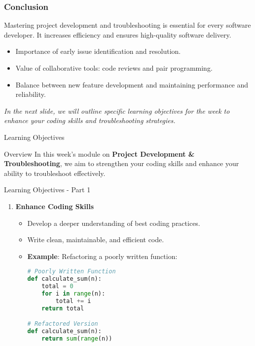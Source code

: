 \documentclass[aspectratio=169]{beamer}
\begin{document}
\begin{frame}[fragile]
    \frametitle{Conclusion}
    Mastering project development and troubleshooting is essential for every software developer. 
    It increases efficiency and ensures high-quality software delivery.
    \begin{itemize}
        \item Importance of early issue identification and resolution.
        \item Value of collaborative tools: code reviews and pair programming.
        \item Balance between new feature development and maintaining performance and reliability.
    \end{itemize}
    
    \textit{In the next slide, we will outline specific learning objectives for the week to enhance your coding skills and troubleshooting strategies.}
\end{frame}

\begin{frame}{Learning Objectives}
    \begin{block}{Overview}
        In this week's module on \textbf{Project Development \& Troubleshooting}, we aim to strengthen your coding skills and enhance your ability to troubleshoot effectively.
    \end{block}
\end{frame}

\begin{frame}{Learning Objectives - Part 1}
    \begin{enumerate}
        \item \textbf{Enhance Coding Skills}
            \begin{itemize}
                \item Develop a deeper understanding of best coding practices.
                \item Write clean, maintainable, and efficient code.
                \item \textbf{Example}: Refactoring a poorly written function:
                \begin{lstlisting}[language=Python]
# Poorly Written Function
def calculate_sum(n):
    total = 0
    for i in range(n):
        total += i
    return total

# Refactored Version
def calculate_sum(n):
    return sum(range(n))
                \end{lstlisting}
            \end{itemize}
    \end{enumerate}
\end{frame}
\end{document}

